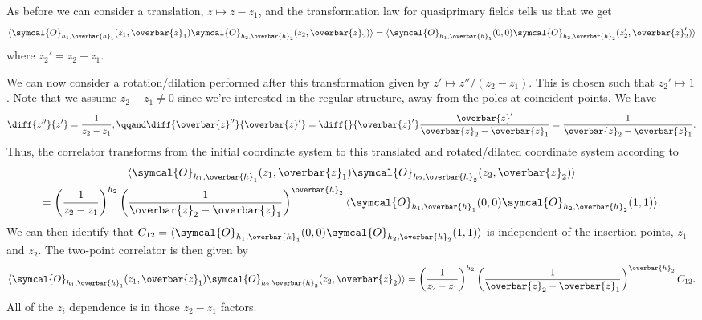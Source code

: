 \documentclass[fleqn]{NotesClass}
\newcommand{\quantumField}[1]{\symcal{#1}}
\DeclarePairedDelimiter{\correlator}{\langle}{\rangle}
\begin{document}
    As before we can consider a translation, \(z \mapsto z - z_1\), and the transformation law for quasiprimary fields tells us that we get
    \begin{equation}
        \correlator{\quantumField{O}_{h_1,\overbar{h}_1}(z_1, \overbar{z}_1) \quantumField{O}_{h_2, \overbar{h}_2}(z_2, \overbar{z}_2)} = \correlator{\quantumField{O}_{h_1, \overbar{h}_1}(0, 0) \quantumField{O}_{h_2, \overbar{h}_2}(z_2', \overbar{z}_2')}
    \end{equation}
    where \(z_2' = z_2 - z_1\).
    
    We can now consider a rotation/dilation performed after this transformation given by \(z' \mapsto z''/(z_2 - z_1)\).
    This is chosen such that \(z_2' \mapsto 1\).
    Note that we assume \(z_2 - z_1 \ne 0\) since we're interested in the regular structure, away from the poles at coincident points.
    We have
    \begin{equation}
        \diff{z''}{z'} = \frac{1}{z_2 - z_1}, \qqand \diff{\overbar{z}''}{\overbar{z}'} = \diff{}{\overbar{z}'}\frac{\overbar{z}'}{\overbar{z}_2 - \overbar{z}_1} = \frac{1}{\overbar{z}_2 - \overbar{z}_1}.
    \end{equation}
    Thus, the correlator transforms from the initial coordinate system to this translated and rotated/dilated coordinate system according to
    \begin{multline}
        \label{eqn:2pt correlator translated and rotated}
        \correlator{\quantumField{O}_{h_1, \overbar{h}_1}(z_1, \overbar{z}_1) \quantumField{O}_{h_2, \overbar{h}_2}(z_2, \overbar{z}_2)}\\
        = \left( \frac{1}{z_2 - z_1} \right)^{h_2} \left( \frac{1}{\overbar{z}_2 - \overbar{z}_1} \right)^{\overbar{h}_2} \correlator{\quantumField{O}_{h_1, \overbar{h}_1}(0, 0) \quantumField{O}_{h_2, \overbar{h}_2}(1, 1)}.
    \end{multline}
    We can then identify that \(C_{12} = \correlator{\quantumField{O}_{h_1, \overbar{h}_1}(0, 0) \quantumField{O}_{h_2, \overbar{h}_2}(1, 1)}\) is independent of the insertion points, \(z_1\) and \(z_2\).
    The two-point correlator is then given by
    \begin{equation}
        \label{eqn:z dependence of 2 pt correlator}
        \correlator{\quantumField{O}_{h_1, \overbar{h}_1}(z_1, \overbar{z}_1) \quantumField{O}_{h_2, \overbar{h}_2}(z_2, \overbar{z}_2)}\\
        = \left( \frac{1}{z_2 - z_1} \right)^{h_2} \left( \frac{1}{\overbar{z}_2 - \overbar{z}_1} \right)^{\overbar{h}_2} C_{12}.
    \end{equation}
    All of the \(z_i\) dependence is in those \(z_2 - z_1\) factors.
    
\end{document}
